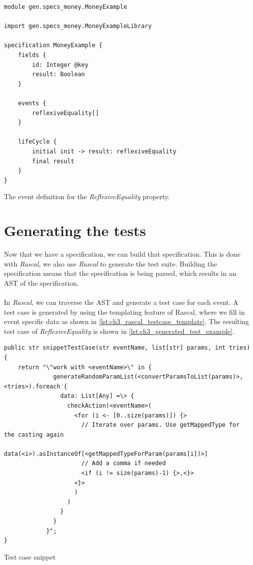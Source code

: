 \FloatBarrier
\begin{sourcecode}[h!]
\begin{lstlisting}[language=Rebel]
module gen.specs_money.MoneyExample

import gen.specs_money.MoneyExampleLibrary

specification MoneyExample {
	fields {
        id: Integer @key
		result: Boolean
	}

	events {
		reflexiveEquality[]
	}

	lifeCycle {
		initial init -> result:	reflexiveEquality
		final result
	}
}
\end{lstlisting}
\caption{The event definition for the \textit{ReflexiveEquality} property.}
\label{lst:ch3_rebel_specification_oneprop}
\end{sourcecode}
\FloatBarrier

\section{Generating the tests}
Now that we have a specification, we can build that specification. This is done with \textit{Rascal}, we also use \textit{Rascal} to generate the test suite. Building the specification means that the specification is being parsed, which results in an AST of the specification.\\
\\
In \textit{Rascal}, we can traverse the AST and generate a test case for each event. A test case is generated by using the templating feature of Rascal, where we fill in event specific data as shown in \autoref{lst:ch3_rascal_testcase_template}. The resulting test case of \textit{ReflexiveEquality} is shown in \autoref{lst:ch3_generated_test_example}.
\FloatBarrier
\begin{sourcecode}[h!]
\begin{lstlisting}[language=Rascal]
public str snippetTestCase(str eventName, list[str] params, int tries) {
	return "\"work with <eventName>\" in {
	          generateRandomParamList(<convertParamsToList(params)>, <tries>).foreach {
	            data: List[Any] =\> {
	              checkAction(<eventName>(
	       	        <for (i <- [0..size(params)]) {>
                      // Iterate over params. Use getMappedType for the casting again
                      data(<i>).asInstanceOf[<getMappedTypeForParam(params[i])>]
                      // Add a comma if needed
                      <if (i != size(params)-1) {>,<}>
                    <}>
	                )
	              )
	            }
	          }
	        }";
}
\end{lstlisting}
\caption{Test case snippet}
\label{lst:ch3_rascal_testcase_template}
\end{sourcecode}
\FloatBarrier


